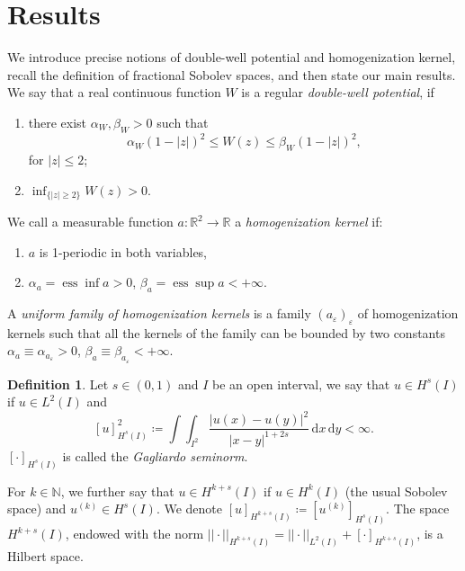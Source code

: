 \documentclass{article}
\theoremstyle{definition}
\newtheorem{Definition}[Theorem]{Definition}
\newcommand{\abs}[1]{\left|#1\right|}
\newcommand{\de}{\mathrm{d}}
\newcommand{\R}{\mathbb{R}}
\newcommand{\N}{\mathbb{N}}
\newcommand{\e}{\varepsilon}
\def\e{\varepsilon}
\begin{document}
\section{Results}
We introduce precise notions of double-well potential and homogenization kernel, recall the definition of fractional Sobolev spaces, and then state our main results.
    We say that a real continuous function $W$ is a regular \emph{double-well potential}, if
    \begin{enumerate}
     \item there exist $\alpha_W,\beta_W>0$ such that 
     \[\alpha_W(1-\abs{z})^2\leq W(z)\leq \beta_W(1-\abs{z})^2,\]
     for $\abs{z} \leq 2$;
     \item $\inf_{\{\abs{z}\ge 2\}} W(z) >0$.
\end{enumerate}
We call a measurable function $a\colon \R^2\to \R$ a \emph{homogenization kernel} if:
    \begin{enumerate}
    \item $a$ is 1-periodic in both variables,
    \item $\alpha_a =\operatorname{ess}\inf a>0$, $\beta_a=\operatorname{ess}\sup a<+\infty$.
\end{enumerate}
A \emph{uniform family of homogenization kernels} is a family $(a_\e)_\e$ of homogenization kernels such that all the kernels of the family can be bounded by two constants $\alpha_a\equiv \alpha_{a_{\scriptstyle \e}}>0$, $\beta_a\equiv \beta_{a_{\scriptstyle\e}}<+\infty$.

\begin{Definition}
    Let $s \in (0,1)$ and $I$ be an open interval, we say that $u\in H^s(I)$ if $u\in L^2(I)$ and
    \[[u]^2_{H^s(I)} \coloneqq \int\int_{I^2} \frac{\abs{u(x)-u(y)}^2}{\abs{x-y}^{1+2s}}\,\de x\,\de y < \infty.\]
    $[\cdot]_{H^s(I)}$ is called the \emph{Gagliardo seminorm}.

    For $k\in \N$, we further say that $u\in H^{k+s}(I)$ if $u \in H^k(I)$ (the usual Sobolev space) and $u^{(k)} \in H^s(I)$. We denote $[u]_{H^{k+s}(I)} \coloneqq [u^{(k)}]_{H^s(I)}$. The space $H^{k+s}(I)$, endowed with the norm $||\cdot||_{H^{k+s}(I)}= ||\cdot||_{L^2(I)} + [\cdot]_{H^{k+s}(I)}$, is a Hilbert space. 
\end{Definition}
 
\end{document}
